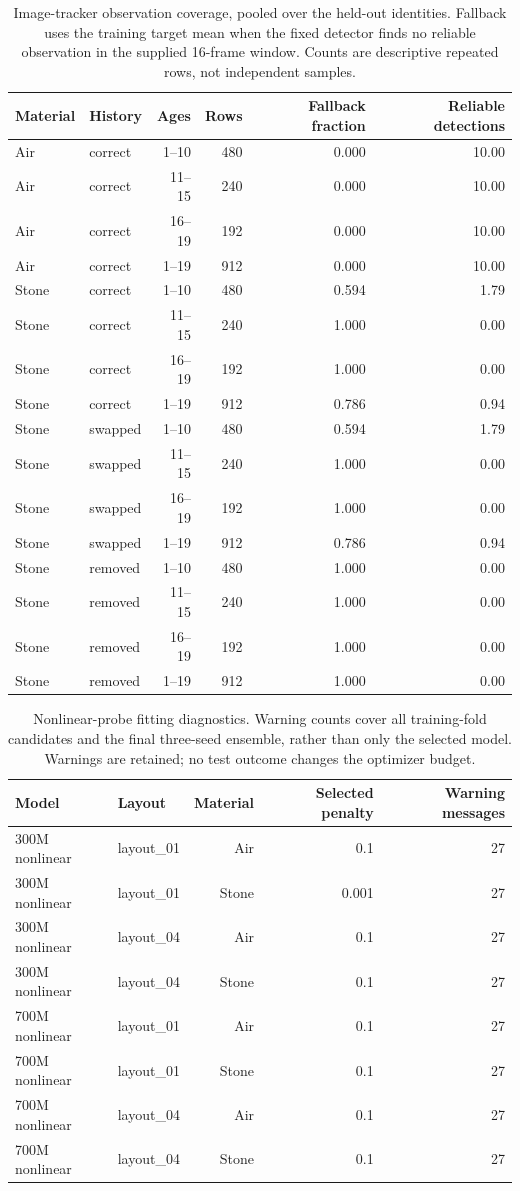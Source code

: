 \begin{table}[!htbp]\centering\small
\caption{Image-tracker observation coverage, pooled over the held-out identities. Fallback uses the training target mean when the fixed detector finds no reliable observation in the supplied 16-frame window. Counts are descriptive repeated rows, not independent samples.}
\begin{tabular}{@{}llrrrr@{}}\toprule Material & History & Ages & Rows & Fallback fraction & Reliable detections\\\midrule
Air & correct & 1--10 & 480 & 0.000 & 10.00\\
Air & correct & 11--15 & 240 & 0.000 & 10.00\\
Air & correct & 16--19 & 192 & 0.000 & 10.00\\
Air & correct & 1--19 & 912 & 0.000 & 10.00\\
Stone & correct & 1--10 & 480 & 0.594 & 1.79\\
Stone & correct & 11--15 & 240 & 1.000 & 0.00\\
Stone & correct & 16--19 & 192 & 1.000 & 0.00\\
Stone & correct & 1--19 & 912 & 0.786 & 0.94\\
Stone & swapped & 1--10 & 480 & 0.594 & 1.79\\
Stone & swapped & 11--15 & 240 & 1.000 & 0.00\\
Stone & swapped & 16--19 & 192 & 1.000 & 0.00\\
Stone & swapped & 1--19 & 912 & 0.786 & 0.94\\
Stone & removed & 1--10 & 480 & 1.000 & 0.00\\
Stone & removed & 11--15 & 240 & 1.000 & 0.00\\
Stone & removed & 16--19 & 192 & 1.000 & 0.00\\
Stone & removed & 1--19 & 912 & 1.000 & 0.00\\
\bottomrule\end{tabular}\end{table}
\begin{table}[!htbp]\centering\small
\caption{Nonlinear-probe fitting diagnostics. Warning counts cover all training-fold candidates and the final three-seed ensemble, rather than only the selected model. Warnings are retained; no test outcome changes the optimizer budget.}
\begin{tabular}{@{}llrrr@{}}\toprule Model & Layout & Material & Selected penalty & Warning messages\\\midrule
300M nonlinear & layout\_01 & Air & 0.1 & 27\\
300M nonlinear & layout\_01 & Stone & 0.001 & 27\\
300M nonlinear & layout\_04 & Air & 0.1 & 27\\
300M nonlinear & layout\_04 & Stone & 0.1 & 27\\
700M nonlinear & layout\_01 & Air & 0.1 & 27\\
700M nonlinear & layout\_01 & Stone & 0.1 & 27\\
700M nonlinear & layout\_04 & Air & 0.1 & 27\\
700M nonlinear & layout\_04 & Stone & 0.1 & 27\\
\bottomrule\end{tabular}\end{table}
